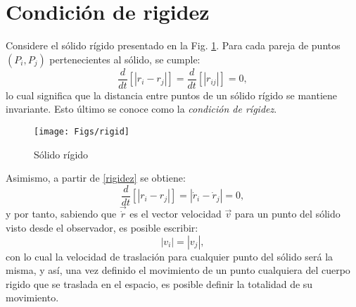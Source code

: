 \section*{Condición de rigidez}
\noindent Considere el sólido rígido presentado en la Fig. \ref{rigid}. Para cada pareja de puntos $(P_i, P_j)$ pertenecientes al sólido, se cumple:
\begin{equation}\label{rigidez}
\frac{d}{dt}[\left|r_i - r_j\right|] = \frac{d}{dt}[\left|r_{ij}\right|] = 0,
\end{equation}
lo cual significa que la distancia entre puntos de un sólido rígido se mantiene invariante. Esto último se conoce como la \emph{condición de rígidez}.\\
\begin{figure}[h]
\centering
\texttt{[image: Figs/rigid]}
\caption[]{Sólido rígido}\label{rigid}
\end{figure}

Asimismo, a partir de \eqref{rigidez} se obtiene:
\begin{equation}
\frac{d}{dt}[\left|r_i - r_j\right|] = \left|\dot{r}_i - \dot{r}_j\right| = 0,
\end{equation}
y por tanto, sabiendo que $\vec{\dot{r}}$ es el vector velocidad $\vec{v}$ para un punto del sólido visto desde el observador, es posible escribir:
\begin{equation}
\left|v_i\right| = \left|v_j\right|,
\end{equation}
con lo cual la velocidad de traslación para cualquier punto del sólido será la misma, y así, una vez definido el movimiento de un punto cualquiera del cuerpo rigido que se traslada en el espacio, es posible definir la totalidad de su movimiento.

